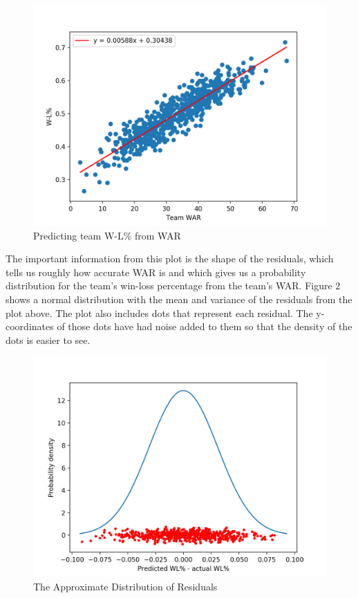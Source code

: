 \documentclass[11pt]{article}
\begin{document}
\begin{figure}
  \includegraphics[width=\linewidth]{figure1.png}
  \caption{Predicting team W-L\% from WAR}
  \label{fig:figure1}
\end{figure} 

The important information from this plot is the shape of the residuals, which tells us roughly how accurate WAR is and which gives us a probability distribution for the team's win-loss percentage from the team's WAR. Figure 2 shows a normal distribution with the mean and variance of the residuals from the plot above. The plot also includes dots that represent each residual. The y-coordinates of those dots have had noise added to them so that the density of the dots is easier to see.\\

\begin{figure}
  \includegraphics[width=\linewidth]{figure2.png}
  \caption{The Approximate Distribution of Residuals}
  \label{fig:figure2}
\end{figure} 
\end{document}
